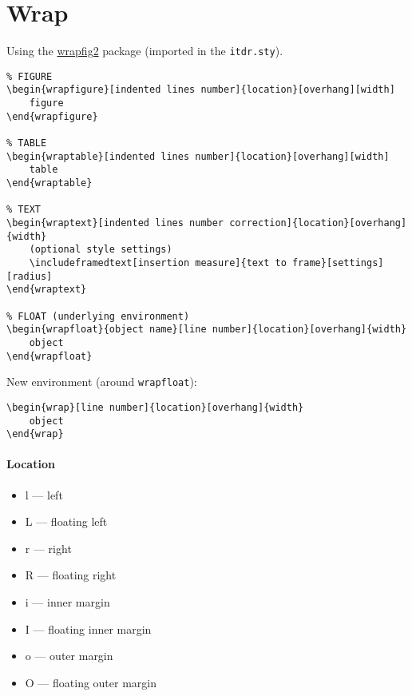 \documentclass[itdr]{subfiles}
\begin{document}
\vfill
\clearpage

\begin{minipage}{\textwidth}
\section{Wrap}

Using the \mbox{\href{https://www.ctan.org/pkg/wrapfig2}{wrapfig2}} package (imported in the \lstinline!itdr.sty!).

\begin{lstlisting}
% FIGURE
\begin{wrapfigure}[indented lines number]{location}[overhang][width]
	figure
\end{wrapfigure}

% TABLE
\begin{wraptable}[indented lines number]{location}[overhang][width]
	table
\end{wraptable}

% TEXT
\begin{wraptext}[indented lines number correction]{location}[overhang]{width}
	(optional style settings)
	\includeframedtext[insertion measure]{text to frame}[settings][radius]
\end{wraptext}

% FLOAT (underlying environment)
\begin{wrapfloat}{object name}[line number]{location}[overhang]{width}
	object
\end{wrapfloat}
\end{lstlisting}

New environment (around \lstinline!wrapfloat!):

\begin{lstlisting}
\begin{wrap}[line number]{location}[overhang]{width}
	object
\end{wrap}
\end{lstlisting}

\paragraph{Location}

\begin{itemize}
	\item l --- left
	\item L --- floating left
	\item r --- right
	\item R --- floating right
	\item i --- inner margin
	\item I --- floating inner margin
	\item o --- outer margin
	\item O --- floating outer margin
\end{itemize}


\end{minipage}
\end{document}
